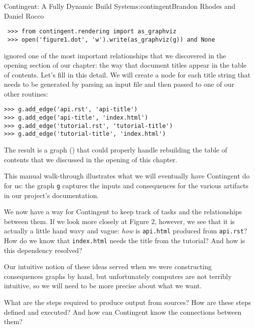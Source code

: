 \begin{aosachapter}{Contingent: A Fully Dynamic Build System}{s:contingent}{Brandon Rhodes and Daniel Rocco}
\begin{verbatim}
 >>> from contingent.rendering import as_graphviz
 >>> open('figure1.dot', 'w').write(as_graphviz(g)) and None
\end{verbatim}

 ignored one of the most important
relationships that we discovered in the opening section of our chapter:
the way that document titles appear in the table of contents. Let's fill
in this detail. We will create a node for each title string that needs
to be generated by parsing an input file and then passed to one of our
other routines:

\begin{verbatim}
>>> g.add_edge('api.rst', 'api-title')
>>> g.add_edge('api-title', 'index.html')
>>> g.add_edge('tutorial.rst', 'tutorial-title')
>>> g.add_edge('tutorial-title', 'index.html')
\end{verbatim}

The result is a graph () that could
properly handle rebuilding the table of contents that we discussed in
the opening of this chapter.


This manual walk-through illustrates what we will eventually have
Contingent do for us: the graph \texttt{g} captures the inputs and
consequences for the various artifacts in our project's documentation.

\label{learning-connections}

We now have a way for Contingent to keep track of tasks and the
relationships between them. If we look more closely at Figure 2,
however, we see that it is actually a little hand wavy and vague:
\emph{how} is \texttt{api.html} produced from \texttt{api.rst}? How do
we know that \texttt{index.html} needs the title from the tutorial? And
how is this dependency resolved?

Our intuitive notion of these ideas served when we were constructing
consequences graphs by hand, but unfortunately computers are not
terribly intuitive, so we will need to be more precise about what we
want.

What are the steps required to produce output from sources? How are
these steps defined and executed? And how can Contingent know the
connections between them?


\end{aosachapter}
